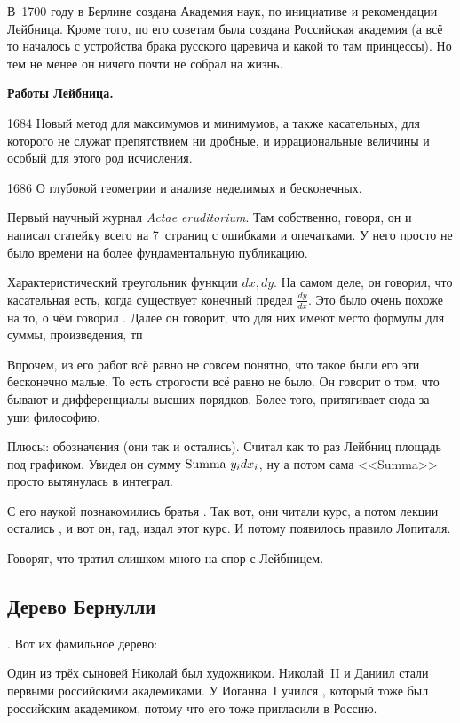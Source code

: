 \documentclass[a4paper,oneside,fleqn,10pt]{article}
\begin{document}
В~1700 году в Берлине создана Академия наук, по инициативе и рекомендации
Лейбница. Кроме того, по его советам была создана Российская академия
(а всё то началось с устройства брака русского царевича и какой то там принцессы).
Но тем не менее он ничего почти не собрал на жизнь.

\textbf{Работы Лейбница.}

1684 Новый метод для максимумов и минимумов, а также касательных, для которого не
служат препятствием ни дробные, и иррациональные величины и особый для этого род исчисления.

1686 О глубокой геометрии и анализе неделимых и бесконечных.

Первый научный журнал \emph{Actae eruditorium}. Там собственно, говоря,
он и написал статейку всего на 7~страниц с ошибками и опечатками.
У него просто не было времени на более фундаментальную публикацию.

Характеристический треугольник функции $dx,dy$. На самом деле, он говорил,
что касательная есть, когда существует конечный предел $\frac{dy}{dx}$.
Это было очень похоже на то, о чём говорил . Далее он говорит,
что для них имеют место формулы для суммы, произведения, тп

Впрочем, из его работ всё равно не совсем понятно, что такое были его эти бесконечно малые.
То есть строгости всё равно не было. Он говорит о том, что бывают и дифференциалы высших порядков.
Более того, притягивает сюда за уши философию.

Плюсы: обозначения (они так и остались). Считал как то раз Лейбниц площадь под графиком.
Увидел он сумму $\hbox{Summa }y_i dx_i$, ну а потом сама <<Summa>> просто вытянулась в интеграл.

С его наукой познакомились братья . Так вот, они читали курс,
а потом лекции остались , и вот он, гад, издал этот курс.
И потому появилось правило Лопиталя.

Говорят, что  тратил слишком много на спор с Лейбницем.

\subsection{Дерево Бернулли}

. Вот их фамильное дерево:


Один из трёх сыновей Николай был художником.
Николай~II и Даниил стали первыми российскими академиками.
У Иоганна~I учился , который тоже был российским академиком, потому что его
тоже пригласили  в Россию.
\end{document}

